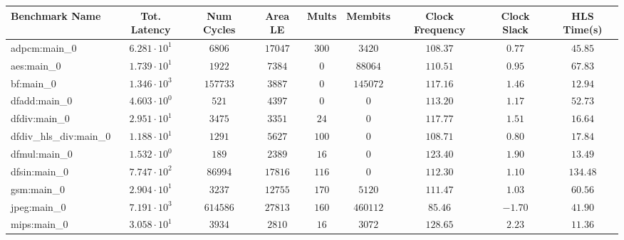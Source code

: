 \begin{tabular}{|l|c|c|c|c|c|c|c|c|}
\hline
Benchmark Name          & Tot. Latency           & Num Cycles  & Area LE    & Mults   & Membits    & Clock Frequency & Clock Slack & HLS Time(s) \\
\hline
adpcm:main\_0           & $ 6.281 \cdot 10^{1} $ & $ 6806    $ & $ 17047  $ & $ 300 $ & $ 3420   $ & $ 108.37      $ & $ 0.77    $ & $ 45.85   $ \\
aes:main\_0             & $ 1.739 \cdot 10^{1} $ & $ 1922    $ & $ 7384   $ & $ 0   $ & $ 88064  $ & $ 110.51      $ & $ 0.95    $ & $ 67.83   $ \\
bf:main\_0              & $ 1.346 \cdot 10^{3} $ & $ 157733  $ & $ 3887   $ & $ 0   $ & $ 145072 $ & $ 117.16      $ & $ 1.46    $ & $ 12.94   $ \\
dfadd:main\_0           & $ 4.603 \cdot 10^{0} $ & $ 521     $ & $ 4397   $ & $ 0   $ & $ 0      $ & $ 113.20      $ & $ 1.17    $ & $ 52.73   $ \\
dfdiv:main\_0           & $ 2.951 \cdot 10^{1} $ & $ 3475    $ & $ 3351   $ & $ 24  $ & $ 0      $ & $ 117.77      $ & $ 1.51    $ & $ 16.64   $ \\
dfdiv\_hls\_div:main\_0 & $ 1.188 \cdot 10^{1} $ & $ 1291    $ & $ 5627   $ & $ 100 $ & $ 0      $ & $ 108.71      $ & $ 0.80    $ & $ 17.84   $ \\
dfmul:main\_0           & $ 1.532 \cdot 10^{0} $ & $ 189     $ & $ 2389   $ & $ 16  $ & $ 0      $ & $ 123.40      $ & $ 1.90    $ & $ 13.49   $ \\
dfsin:main\_0           & $ 7.747 \cdot 10^{2} $ & $ 86994   $ & $ 17816  $ & $ 116 $ & $ 0      $ & $ 112.30      $ & $ 1.10    $ & $ 134.48  $ \\
gsm:main\_0             & $ 2.904 \cdot 10^{1} $ & $ 3237    $ & $ 12755  $ & $ 170 $ & $ 5120   $ & $ 111.47      $ & $ 1.03    $ & $ 60.56   $ \\
jpeg:main\_0            & $ 7.191 \cdot 10^{3} $ & $ 614586  $ & $ 27813  $ & $ 160 $ & $ 460112 $ & $ 85.46       $ & $ -1.70   $ & $ 41.90   $ \\
mips:main\_0            & $ 3.058 \cdot 10^{1} $ & $ 3934    $ & $ 2810   $ & $ 16  $ & $ 3072   $ & $ 128.65      $ & $ 2.23    $ & $ 11.36   $ \\

\end{tabular}
